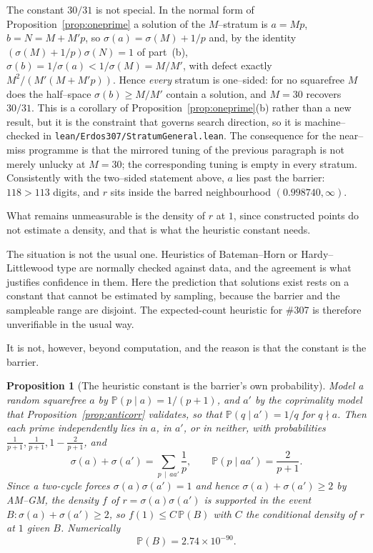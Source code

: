 \documentclass[11pt]{article}
\newtheorem{proposition}[theorem]{Proposition}
\theoremstyle{definition}
\begin{document}
The constant $30/31$ is not special. In the normal form of Proposition~\ref{prop:oneprime} a solution
of the $M$--stratum is $a=Mp$, $b=N=M+M'p$, so $\sigma(a)=\sigma(M)+1/p$ and, by the identity
$(\sigma(M)+1/p)\sigma(N)=1$ of part~(b), $\sigma(b)=1/\sigma(a)<1/\sigma(M)=M/M'$, with defect
exactly $M^2/(M'(M+M'p))$. Hence \emph{every} stratum is one--sided: for no squarefree $M$ does the
half--space $\sigma(b)\ge M/M'$ contain a solution, and $M=30$ recovers $30/31$. This is a corollary
of Proposition~\ref{prop:oneprime}(b) rather than a new result, but it is the constraint that governs
search direction, so it is machine--checked in \texttt{lean/Erdos307/StratumGeneral.lean}. The
consequence for the near--miss programme is that the mirrored tuning of the previous paragraph is not
merely unlucky at $M=30$; the corresponding tuning is empty in every stratum. Consistently with the two--sided statement above, $a$
lies past the barrier: $118>113$ digits, and $r$ sits inside the barred neighbourhood
$(0.998740,\infty)$.

What remains unmeasurable is the density of $r$ at $1$,
since constructed points do not estimate a density, and that is what the heuristic constant needs.

The situation is not the usual one. Heuristics of Bateman--Horn or Hardy--Littlewood
type are normally checked against data, and the agreement is what justifies confidence in them. Here
the prediction that solutions exist rests on a constant that cannot be estimated by sampling,
because the barrier and the sampleable range are disjoint. The expected-count heuristic for \#307 is
therefore unverifiable in the usual way.

It is not, however, beyond computation, and the reason is that the constant is the barrier.

\begin{proposition}[The heuristic constant is the barrier's own probability]\label{prop:f1}
Model a random squarefree $a$ by $\mathbb{P}(p\mid a)=1/(p+1)$, and $a'$ by the coprimality model
that Proposition~\textup{\ref{prop:anticorr}} validates, so that $\mathbb{P}(q\mid a')=1/q$ for
$q\nmid a$. Then each prime independently lies in $a$, in $a'$, or in neither, with probabilities
$\tfrac1{p+1},\tfrac1{p+1},1-\tfrac2{p+1}$, and
\[ \sigma(a)+\sigma(a')=\sum_{p\,\mid\,aa'}\frac1p,\qquad \mathbb{P}(p\mid aa')=\frac2{p+1}. \]
Since a two-cycle forces $\sigma(a)\sigma(a')=1$ and hence $\sigma(a)+\sigma(a')\ge2$ by
\textup{AM--GM}, the density $f$ of $r=\sigma(a)\sigma(a')$ is supported in the event
$B:\sigma(a)+\sigma(a')\ge2$, so $f(1)\le C\,\mathbb{P}(B)$ with $C$ the conditional density of $r$
at $1$ given $B$. Numerically
\[ \mathbb{P}(B)=2.74\times10^{-90}. \]
\end{proposition}
\end{document}
